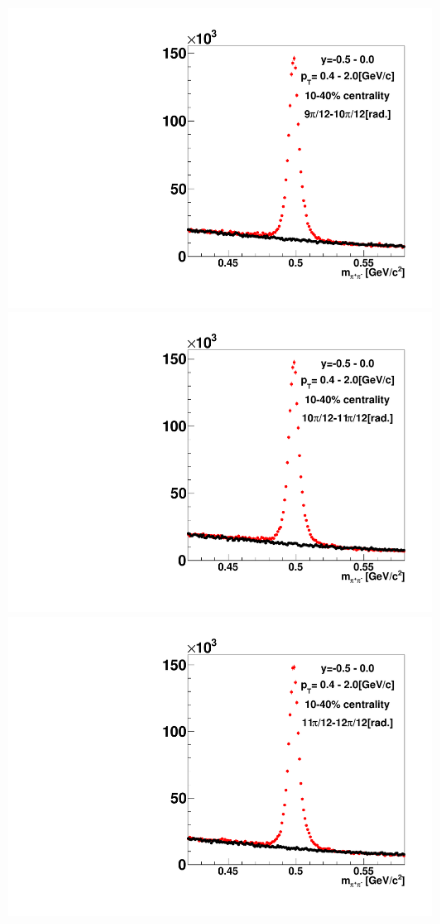 \begin{figure}[h]
\includegraphics[width=0.14\linewidth]{chapterX/fig/ks_v2_sig/kf_ptslice0_cent1_ks_flow_phi10_rap1_check.pdf}
\includegraphics[width=0.14\linewidth]{chapterX/fig/ks_v2_sig/kf_ptslice0_cent1_ks_flow_phi11_rap1_check.pdf}
\includegraphics[width=0.14\linewidth]{chapterX/fig/ks_v2_sig/kf_ptslice0_cent1_ks_flow_phi12_rap1_check.pdf}


\end{figure}
